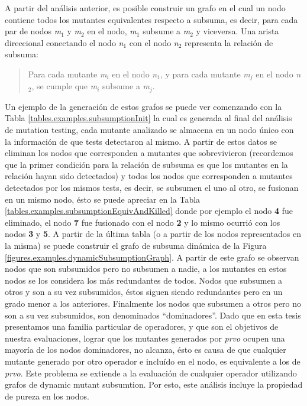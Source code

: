 A partir del an\'alisis anterior, es posible construir un grafo en el cual un nodo contiene todos los mutantes equivalentes respecto a subsuma, es decir, para cada par de nodos \emph{m$_1$} y \emph{m$_2$} en el nodo, \emph{m$_1$} subsume a \emph{m$_2$} y viceversa. Una arista direccional conectando el nodo \emph{n$_1$} con el nodo \emph{n$_2$} representa la relaci\'on de subsuma:
\begin{quote}
	Para cada mutante \emph{m$_i$} en el nodo \emph{n$_1$}, y para cada mutante \emph{m$_j$} en el nodo \emph{n$_2$}, se cumple que \emph{m$_i$} subsume a \emph{m$_j$}.
\end{quote}
Un ejemplo de la generaci\'on de estos grafos se puede ver comenzando con la Tabla \ref{tables.examples.subsumptionInit} la cual es generada al final del an\'alisis de mutation testing, cada mutante analizado se almacena en un nodo \'unico con la informaci\'on de que tests detectaron al mismo. A partir de estos datos se eliminan los nodos que corresponden a mutantes que sobrevivieron (recordemos que la primer condici\'on para la relaci\'on de subsuma es que los mutantes en la relaci\'on hayan sido detectados) y todos los nodos que corresponden a mutantes detectados por los mismos tests, es decir, se subsumen el uno al otro, se fusionan en un mismo nodo, \'esto se puede apreciar en la Tabla \ref{tables.examples.subsumptionEquivAndKilled} donde por ejemplo el nodo \textbf{4} fue eliminado, el nodo \textbf{7} fue fusionado con el nodo \textbf{2} y lo mismo ocurri\'o con los nodos \textbf{3} y \textbf{5}. A partir de la \'ultima tabla (o a partir de los nodos representados en la misma) se puede construir el grafo de subsuma din\'amica de la Figura \ref{figures.examples.dynamicSubsumptionGraph}.
A partir de este grafo se observan nodos que son subsumidos pero no subsumen a nadie, a los mutantes en estos nodos se los considera los m\'as redundantes de todos. Nodos que subsumen a otros y son a su vez subsumidos, \'estos siguen siendo redundantes pero en un grado menor a los anteriores. Finalmente los nodos que subsumen a otros pero no son a su vez subsumidos, son denominados ``dominadores''. Dado que en esta tesis presentamos una familia particular de operadores, y que son el objetivos de nuestra evaluaciones, lograr que los mutantes generados por \emph{prvo} ocupen una mayor\'ia de los nodos dominadores, no alcanza, \'esto es causa de que cualquier mutante generado por otro operador e inclu\'ido en el nodo, es equivalente a los de \emph{prvo}. Este problema se extiende a la evaluaci\'on de cualquier operador utilizando grafos de dynamic mutant subsumtion. Por esto, este an\'alisis incluye la propiedad de pureza en los nodos.
